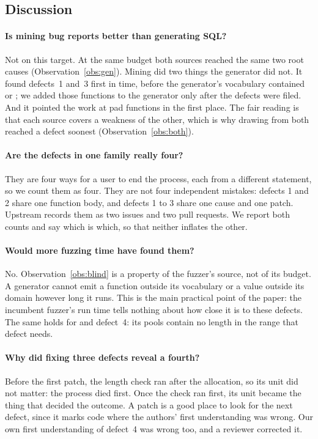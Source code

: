 \subsection{Discussion}
\label{sec:discussion}

\paragraph{Is mining bug reports better than generating SQL?} Not on this
target. At the same budget both sources reached the same two root causes
(Observation~\ref{obs:gen}). Mining did two things the generator did not. It
found defects~1 and~3 first in time, before the generator's vocabulary contained
 or ; we added those functions to the generator only after
the defects were filed. And it pointed the work at pad functions in the first
place. The fair reading is that each source covers a weakness of the other, which
is why drawing from both
reached a defect soonest (Observation~\ref{obs:both}).

\paragraph{Are the defects in one family really four?} They are four ways for a
user to end the process, each from a different statement, so we count them as
four. They are not four independent mistakes: defects 1 and 2 share one
function body, and defects 1 to 3 share one cause and one patch. Upstream records
them as two issues and two pull requests. We report both counts and say which is
which, so that neither inflates the other.

\paragraph{Would more fuzzing time have found them?} No.
Observation~\ref{obs:blind} is a property of the fuzzer's source, not of its
budget. A generator cannot emit a function outside its vocabulary or a value
outside its domain however long it runs. This is the main practical point of the
paper: the incumbent fuzzer's run time tells nothing about how close it is to
these defects. The same holds for \tool and defect~4:
its pools contain no length in the range that defect needs.

\paragraph{Why did fixing three defects reveal a fourth?} Before the first patch,
the length check ran after the allocation, so its unit did not matter: the
process died first. Once the check ran first, its unit became the thing that
decided the outcome. A
patch is a good place to look for the next defect, since it marks code where the
authors' first understanding was wrong. Our own first understanding of defect~4
was wrong too, and a reviewer corrected it.


